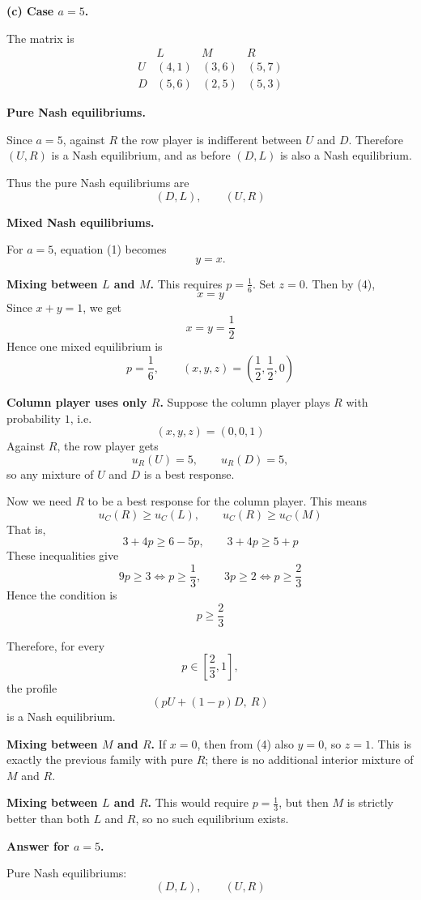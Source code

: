 \textbf{(c) Case \(a=5\).}

The matrix is
\[
\begin{array}{c|ccc}
 & L & M & R\\
\hline
U & (4,1) & (3,6) & (5,7)\\
D & (5,6) & (2,5) & (5,3)
\end{array}
\]

\textbf{Pure Nash equilibriums.}

Since \(a=5\), against \(R\) the row player is indifferent between \(U\) and \(D\). Therefore \((U,R)\) is a Nash equilibrium, and as before \((D,L)\) is also a Nash equilibrium.

Thus the pure Nash equilibriums are
\[
(D,L),\qquad (U,R)
\]

\textbf{Mixed Nash equilibriums.}

For \(a=5\), equation (1) becomes
\[
y=x. \tag{4}
\]

\textbf{Mixing between \(L\) and \(M\).}
This requires \(p=\frac16\). Set \(z=0\). Then by (4),
\[
x=y
\]
Since \(x+y=1\), we get
\[
x=y=\frac12
\]
Hence one mixed equilibrium is
\[
p=\frac16,\qquad (x,y,z)=\left(\frac12,\frac12,0\right)
\]

\textbf{Column player uses only \(R\).}
Suppose the column player plays \(R\) with probability \(1\), i.e.
\[
(x,y,z)=(0,0,1)
\]
Against \(R\), the row player gets
\[
u_R(U)=5,\qquad u_R(D)=5,
\]
so any mixture of \(U\) and \(D\) is a best response.

Now we need \(R\) to be a best response for the column player. This means
\[
u_C(R)\ge u_C(L),\qquad u_C(R)\ge u_C(M)
\]
That is,
\[
3+4p \ge 6-5p,
\qquad
3+4p \ge 5+p
\]
These inequalities give
\[
9p\ge 3 \iff p\ge \frac13,
\qquad
3p\ge 2 \iff p\ge \frac23
\]
Hence the condition is
\[
p\ge \frac23
\]

Therefore, for every
\[
p\in\left[\frac23,1\right],
\]
the profile
\[
\left(pU+(1-p)D,\ R\right)
\]
is a Nash equilibrium.

\textbf{Mixing between \(M\) and \(R\).}
If \(x=0\), then from (4) also \(y=0\), so \(z=1\). This is exactly the previous family with pure \(R\); there is no additional interior mixture of \(M\) and \(R\).

\textbf{Mixing between \(L\) and \(R\).}
This would require \(p=\frac13\), but then \(M\) is strictly better than both \(L\) and \(R\), so no such equilibrium exists.

\textbf{Answer for \(a=5\).}

Pure Nash equilibriums:
\[
(D,L),\qquad (U,R)
\]

